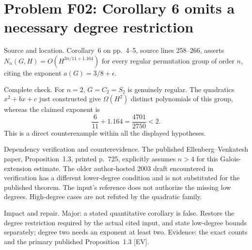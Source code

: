 \documentclass[10pt]{article}
\begin{document}
\section*{Problem F02: Corollary 6 omits a necessary degree restriction}
Source and location. Corollary 6 on pp. 4–5, source lines 258–266, asserts \(N_n(G,H)=O(H^{3n/11+1.164})\) for every regular permutation group of order \(n\), citing the exponent \(a(G)=3/8+\epsilon\).\par
Complete check. For \(n=2\), \(G=C_2=S_2\) is genuinely regular. The quadratics \(x^2+bx+c\) just constructed give \(\Omega(H^2)\) distinct polynomials of this group, whereas the claimed exponent is \[\frac6{11}+1.164=\frac{4701}{2750}<2.\] This is a direct counterexample within all the displayed hypotheses.\par
Dependency verification and counterevidence. The published Ellenberg–Venkatesh paper, Proposition 1.3, printed p. 725, explicitly assumes \(n>4\) for this Galois-extension estimate. The older author-hosted 2003 draft encountered in verification has a different lower-degree condition and is not substituted for the published theorem. The input’s reference does not authorize the missing low degrees. High-degree cases are not refuted by the quadratic family.\par
Impact and repair. Major: a stated quantitative corollary is false. Restore the degree restriction required by the actual cited input, and state low-degree bounds separately; degree two needs an exponent at least two. Evidence: the exact counts and the primary published Proposition 1.3 [EV].\par
\end{document}
